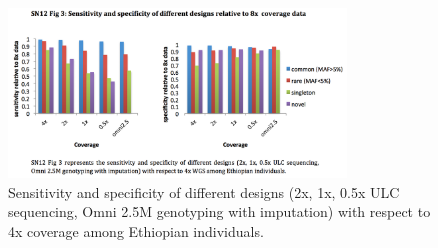 \begin{figure}
\centering
\includegraphics[trim={0 2cm 0 1.5cm},clip,width=0.8\textwidth]{fig/SN12f3}
\caption[Sensitivity and specificity of different designs relative to 8x coverage data.]{Sensitivity and specificity of different designs (2x, 1x, 0.5x \gls{ULC} sequencing, Omni 2.5M genotyping with imputation) with respect to 4x coverage among Ethiopian individuals.}
\label{fig:SN12f3}
\end{figure}